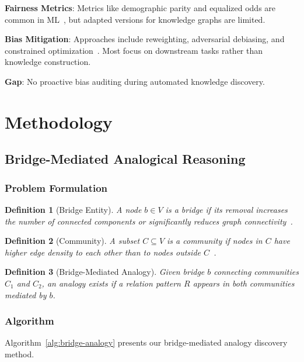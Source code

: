 \documentclass[11pt,twocolumn]{article}
\newtheorem{definition}{Definition}
\begin{document}
\textbf{Fairness Metrics}: Metrics like demographic parity and equalized odds are common in ML~\cite{hardt2016equality}, but adapted versions for knowledge graphs are limited.

\textbf{Bias Mitigation}: Approaches include reweighting, adversarial debiasing, and constrained optimization~\cite{kamiran2012data,zhang2018mitigating}. Most focus on downstream tasks rather than knowledge construction.

\textbf{Gap}: No proactive bias auditing during automated knowledge discovery.

\section{Methodology}
\label{sec:methodology}

\subsection{Bridge-Mediated Analogical Reasoning}

\subsubsection{Problem Formulation}

\begin{definition}[Bridge Entity]
A node $b \in V$ is a \emph{bridge} if its removal increases the number of connected components or significantly reduces graph connectivity~\cite{girvan2002community}.
\end{definition}

\begin{definition}[Community]
A subset $C \subseteq V$ is a \emph{community} if nodes in $C$ have higher edge density to each other than to nodes outside $C$~\cite{fortunato2010community}.
\end{definition}

\begin{definition}[Bridge-Mediated Analogy]
Given bridge $b$ connecting communities $C_1$ and $C_2$, an analogy exists if a relation pattern $R$ appears in both communities mediated by $b$.
\end{definition}

\subsubsection{Algorithm}

Algorithm~\ref{alg:bridge-analogy} presents our bridge-mediated analogy discovery method.
\end{document}
